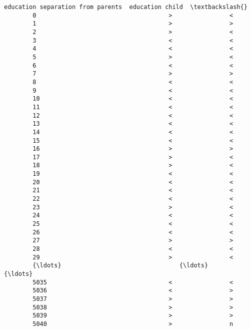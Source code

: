 \documentclass[11pt]{article}
\begin{document}
\begin{Verbatim}[commandchars=\\\{\}]
              education separation from parents  education child  \textbackslash{}
        0                                     >                <   
        1                                     >                >   
        2                                     >                <   
        3                                     <                <   
        4                                     <                <   
        5                                     >                <   
        6                                     <                <   
        7                                     >                >   
        8                                     <                <   
        9                                     <                <   
        10                                    <                <   
        11                                    <                <   
        12                                    <                <   
        13                                    <                <   
        14                                    <                <   
        15                                    <                <   
        16                                    >                >   
        17                                    >                <   
        18                                    >                <   
        19                                    <                <   
        20                                    <                <   
        21                                    <                <   
        22                                    <                <   
        23                                    >                <   
        24                                    <                <   
        25                                    <                <   
        26                                    <                <   
        27                                    >                >   
        28                                    <                <   
        29                                    >                <   
        {\ldots}                                 {\ldots}              {\ldots}   
        5035                                  <                <   
        5036                                  <                >   
        5037                                  >                >   
        5038                                  >                >   
        5039                                  >                >   
        5040                                  >                n   

\end{Verbatim}
\end{document}
